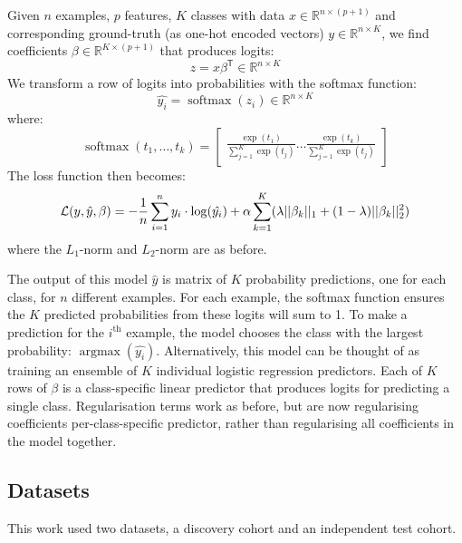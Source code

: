 \documentclass[draft]{article}
\DeclareMathOperator*{\argmax}{argmax}
\DeclareMathOperator*{\softmax}{softmax}
\newcommand{\equationname}[1]{%
    \begingroup
        \leavevmode
        \addcontentsline{equ}{equations}{\protect\numberline{\theequation}#1}%
    \endgroup   
}
\begin{document}
Given \(n\) examples, \(p\) features, \(K\) classes with data \(x \in \mathbb{R}^{n \times (p + 1)}\) and corresponding ground-truth (as one-hot encoded vectors) \(y \in \mathbb{R}^{n \times K}\), we find coefficients \(\beta \in \mathbb{R}^{K \times (p + 1)}\) that produces logits:
\[z = x \beta^\mathsf{T} \in \mathbb{R}^{n \times K}\]
We transform a row of logits into probabilities with the softmax function:
\[\hat{y_i} = \softmax(z_i) \in \mathbb{R}^{n \times K}\]
where:
\[\softmax(t_1,\hdots , t_k) =
    \begin{bmatrix}
        \frac{\exp(t_1)}{\sum_{j=1}^{K} \exp(t_j)}
        \hdots
        \frac{\exp(t_k)}{\sum_{j=1}^{K} \exp(t_j)}
    \end{bmatrix}
\]
The loss function then becomes:
\begin{equation} \equationname{Elastic Net logistic regression} \label{eqn:mc_log_elastic_net}
    \mathcal{L}(y, \hat{y}, \beta) = -\frac{1}{n}\sum_{i=1}^{n} y_i \cdot \log(\hat{y_i}) + \alpha\sum_{k=1}^{K}(\lambda||\beta_k||_1 + (1 - \lambda)||\beta_k||_2^2)
\end{equation}
where the \(L_1\)-norm and \(L_2\)-norm are as before.

The output of this model \(\hat{y}\) is matrix of \(K\) probability predictions, one for each class, for \(n\) different examples. For each example, the softmax function ensures the \(K\) predicted probabilities from these logits will sum to 1. To make a prediction for the \(i^\text{th}\) example, the model chooses the class with the largest probability: \(\argmax(\hat{y_i})\). Alternatively, this model can be thought of as training an ensemble of \(K\) individual logistic regression predictors. Each of \(K\) rows of \(\beta\) is a class-specific linear predictor that produces logits for predicting a single class. Regularisation terms work as before, but are now regularising coefficients per-class-specific predictor, rather than regularising all coefficients in the model together.

\subsection{Datasets}
This work used two datasets, a discovery cohort and an independent test cohort.
\end{document}
